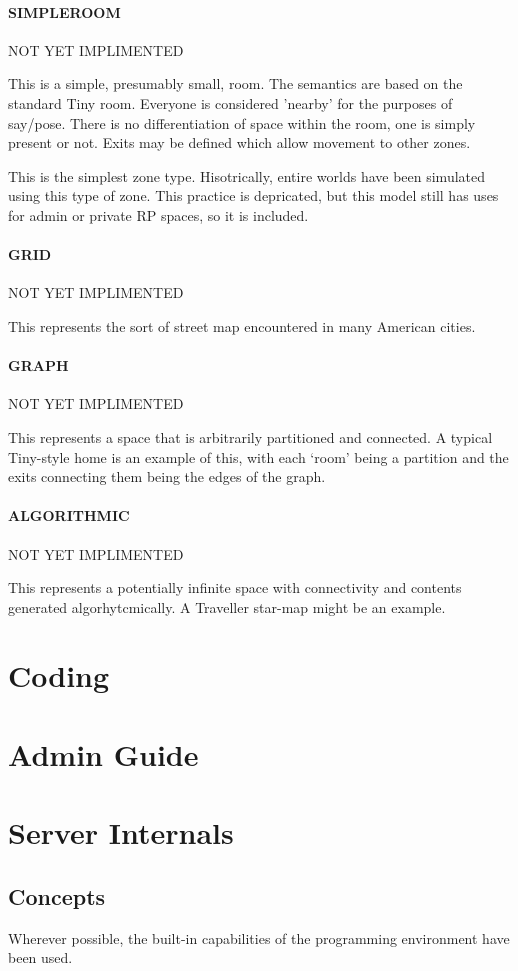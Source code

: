 \documentclass[10pt,letterpaper,twoside]{book}
\begin{document}
\subsection{SIMPLEROOM}
NOT YET IMPLIMENTED

This is a simple, presumably small, room.
The semantics are based on the standard Tiny room.
Everyone is considered 'nearby' for the purposes of say/pose.
There is no differentiation of space within the room, one is simply present or not.
Exits may be defined which allow movement to other zones.

This is the simplest zone type.
Hisotrically, entire worlds have been simulated using this type of zone.
This practice is depricated, but this model still has uses for admin or private RP spaces, so it is included.
\subsection{GRID}
NOT YET IMPLIMENTED

This represents the sort of street map encountered in many American cities.
\subsection{GRAPH}
NOT YET IMPLIMENTED

This represents a space that is arbitrarily partitioned and connected.
A typical Tiny-style home is an example of this, with each `room' being a partition and the exits connecting them being the edges of the graph.
\subsection{ALGORITHMIC}
NOT YET IMPLIMENTED

This represents a potentially infinite space with connectivity and contents generated algorhytcmically.
A Traveller star-map might be an example.

\part{Coding}
\part{Admin Guide}
\part{Server Internals}
\chapter{Concepts}
Wherever possible, the built-in capabilities of the programming environment have been used.
\end{document}
